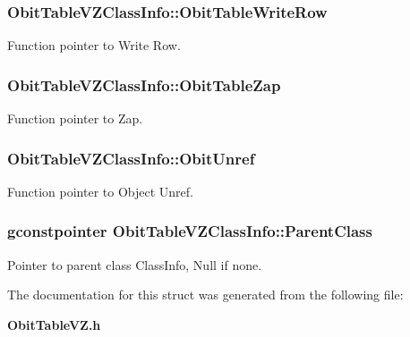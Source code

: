 \subsubsection{ {\bf Obit\-Table\-VZClass\-Info::Obit\-Table\-Write\-Row}}\label{structObitTableVZClassInfo_o26}


Function pointer to Write Row. 

\subsubsection{ {\bf Obit\-Table\-VZClass\-Info::Obit\-Table\-Zap}}\label{structObitTableVZClassInfo_o19}


Function pointer to Zap. 

\subsubsection{ {\bf Obit\-Table\-VZClass\-Info::Obit\-Unref}}\label{structObitTableVZClassInfo_o11}


Function pointer to Object Unref. 

\subsubsection{\setlength{\rightskip}{0pt plus 5cm}gconstpointer {\bf Obit\-Table\-VZClass\-Info::Parent\-Class}}\label{structObitTableVZClassInfo_o3}


Pointer to parent class Class\-Info, Null if none. 



The documentation for this struct was generated from the following file:\begin{CompactItemize}
\item 
{\bf Obit\-Table\-VZ.h}\end{CompactItemize}
